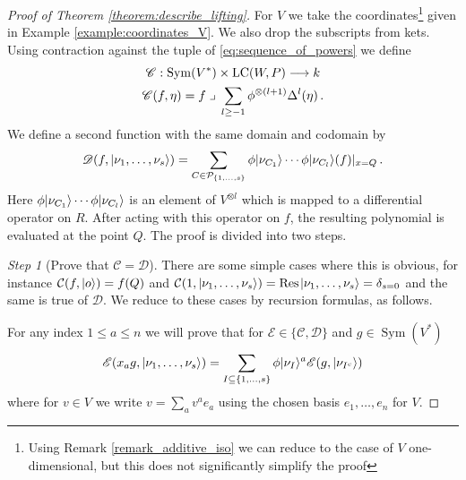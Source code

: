 \documentclass[english,letter paper,12pt,reqno]{article}
\DeclarePairedDelimiter\ket{\lvert}{\rangle}
\theoremstyle{example}
\numberwithin{equation}{section}
\DeclareMathOperator{\Sym}{Sym}
\DeclareMathOperator{\LC}{LC}
\begin{document}
\begin{proof}[Proof of Theorem \ref{theorem:describe_lifting}] For $V$ we take the coordinates\footnote{Using Remark \ref{remark_additive_iso} we can reduce to the case of $V$ one-dimensional, but this does not significantly simplify the proof} given in Example \ref{example:coordinates_V}. We also drop the subscripts from kets. Using contraction against the tuple of \eqref{eq:sequence_of_powers} we define
\begin{gather*}
\mathscr{C}: \Sym(V^*) \times \LC( W, P ) \lto k\\
\mathscr{C}(f, \eta) = f \; \lrcorner \; \sum_{l \ge -1} \phi^{\otimes (l+1)} \Delta^l( \eta )\,.
\end{gather*}
We define a second function with the same domain and codomain by
\[
\mathscr{D}(f, \ket{\nu_1, \ldots, \nu_s}) = \sum_{C \in \cat{P}_{\{1,\ldots,s\}}} \phi \ket{\nu_{C_1}} \cdots \phi \ket{\nu_{C_l}}(f)\arrowvert_{x = Q}\,.
\]
Here $\phi \ket{\nu_{C_1}} \cdots \phi \ket{\nu_{C_l}}$ is an element of $V^{\otimes l}$ which is mapped to a differential operator on $R$. After acting with this operator on $f$, the resulting polynomial is evaluated at the point $Q$. The proof is divided into two steps.

\emph{Step 1} (Prove that $\mathscr{C} = \mathscr{D}$). There are some simple cases where this is obvious, for instance $\cat{C}(f, \ket{o}) = f( Q )$ and $\cat{C}( 1, \ket{\nu_1,\ldots,\nu_s} ) = \Res\;\ket{\nu_1,\ldots,\nu_s} = \delta_{s = 0}$ and the same is true of $\mathscr{D}$. We reduce to these cases by recursion formulas, as follows.

For any index $1 \le a \le n$ we will prove that for $\mathscr{E} \in \{ \mathscr{C}, \mathscr{D} \}$ and $g \in \Sym(V^*)$
\begin{equation}\label{eq:recur_formula}
\mathscr{E}( x_a g, \ket{\nu_1,\ldots,\nu_s} ) = \sum_{I \subseteq \{ 1,\ldots,s\}} \phi\ket{\nu_I}^a \mathscr{E}( g, \ket{\nu_{I^c}})
\end{equation}
where for $v \in V$ we write $v = \sum_a v^a e_a$ using the chosen basis $e_1,\ldots,e_n$ for $V$.


\end{proof}
\end{document}
